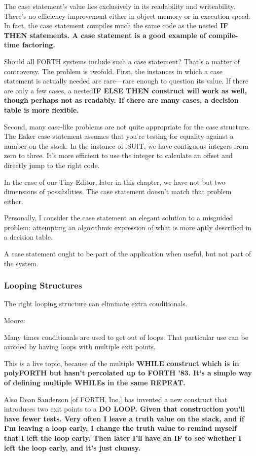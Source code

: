 The case statement's value lies exclusively in its readability and
writeability. There's no efficiency improvement either in object memory
or in execution speed. In fact, the case statement compiles much the
same code as the nested \bf{IF THEN} statements. A case statement is a
good example of compile-time factoring.

Should all FORTH systems include such a case statement? That's
a matter of controversy. The problem is twofold. First, the instances in
which a case statement is actually needed are rare---rare enough to
question its value. If there are only a few cases, a nested\bf{IF ELSE THEN}
construct will work as well, though perhaps not as readably. If there are
many cases, a decision table is more flexible.

Second, many case-like problems are not quite appropriate for the
case structure. The Eaker case statement assumes that you're testing for
equality against a number on the stack. In the instance of .SUIT, we have
contiguous integers from zero to three. It's more efficient to use the
integer to calculate an offset and directly jump to the right code.

In the case of our Tiny Editor, later in this chapter, we have not but
two dimensions of possibilities. The case statement doesn't match that
problem either.

Personally, I consider the case statement an elegant solution to a
misguided problem: attempting an algorithmic expression of what is
more aptly described in a decision table.

A case statement ought to be part of the application when useful,
but not part of the system.

\subsubsection{Looping Structures}

The right looping structure can eliminate extra conditionals.

Moore:

Many times conditionals are used to get out of loops. That particular use
can be avoided by having loops with multiple exit points.

This is a live topic, because of the multiple \bf{WHILE} construct which is in
polyFORTH but hasn't percolated up to FORTH '83. It's a simple way of
defining multiple \bf{WHILE}s in the same \bf{REPEAT}.

Also Dean Sanderson [of FORTH, Inc.] has invented a new construct that
introduces two exit points to a \bf{DO LOOP}. Given that construction you'll
have fewer tests. Very often I leave a truth value on the stack, and if I'm
leaving a loop early, I change the truth value to remind myself that I left
the loop early. Then later I'll have an \bf{IF} to see whether I left the
loop early, and it's just clumsy.

